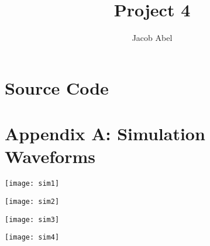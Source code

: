 \documentclass[12pt,letterpaper,titlepage]{article}
\author{Jacob Abel}
\title{Project 4}
\begin{document}
\maketitle


\tableofcontents
\pagebreak


\pagebreak
\begin{raggedright}


\section{Source Code}


\clearpage
\section{Appendix A: Simulation Waveforms}
\texttt{[image: sim1]}

\texttt{[image: sim2]}

\texttt{[image: sim3]}

\texttt{[image: sim4]}

\end{raggedright}
\end{document}
